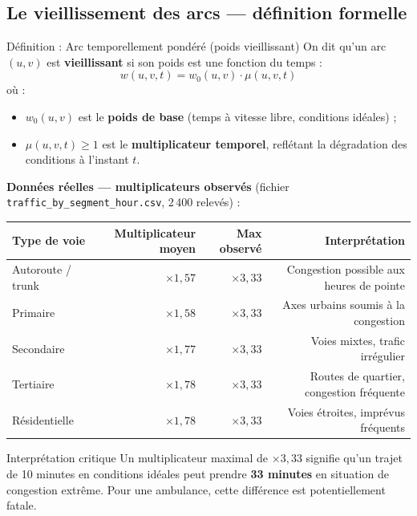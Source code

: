 \documentclass[12pt,a4paper]{article}
\theoremstyle{definition}
\theoremstyle{remark}
\begin{document}
\subsection{Le vieillissement des arcs — définition formelle}

\begin{defbox}{Définition : Arc temporellement pondéré (poids vieillissant)}
On dit qu'un arc $(u,v)$ est \textbf{vieillissant} si son poids est une
fonction du temps :
$$
w(u,v,t) = w_0(u,v) \cdot \mu(u,v,t)
$$
où :
\begin{itemize}
  \item $w_0(u,v)$ est le \textbf{poids de base} (temps à vitesse libre,
        conditions idéales) ;
  \item $\mu(u,v,t) \geq 1$ est le \textbf{multiplicateur temporel},
        reflétant la dégradation des conditions à l'instant $t$.
\end{itemize}
\end{defbox}

\noindent\textbf{Données réelles — multiplicateurs observés} (fichier
\texttt{traffic\_by\_segment\_hour.csv}, 2\,400 relevés) :

\begin{center}
\begin{tabular}{lrrr}
  \toprule
  \textbf{Type de voie} & \textbf{Multiplicateur moyen} &
  \textbf{Max observé} & \textbf{Interprétation} \\
  \midrule
  Autoroute / trunk  & $\times 1{,}57$  & $\times 3{,}33$ &
      Congestion possible aux heures de pointe \\
  Primaire           & $\times 1{,}58$  & $\times 3{,}33$ &
      Axes urbains soumis à la congestion \\
  Secondaire         & $\times 1{,}77$  & $\times 3{,}33$ &
      Voies mixtes, trafic irrégulier \\
  Tertiaire          & $\times 1{,}78$  & $\times 3{,}33$ &
      Routes de quartier, congestion fréquente \\
  Résidentielle      & $\times 1{,}78$  & $\times 3{,}33$ &
      Voies étroites, imprévus fréquents \\
  \bottomrule
\end{tabular}
\end{center}

\begin{alertbox}{Interprétation critique}
Un multiplicateur maximal de $\times 3{,}33$ signifie qu'un trajet de
10 minutes en conditions idéales peut prendre \textbf{33 minutes} en
situation de congestion extrême. Pour une ambulance, cette différence
est potentiellement fatale.
\end{alertbox}
\end{document}

